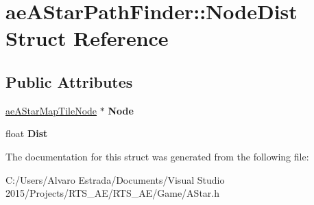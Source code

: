 \hypertarget{structae_a_star_path_finder_1_1_node_dist}{}\section{ae\+A\+Star\+Path\+Finder\+:\+:Node\+Dist Struct Reference}
\label{structae_a_star_path_finder_1_1_node_dist}
\subsection*{Public Attributes}
\begin{DoxyCompactItemize}
\item 
\hyperlink{classae_a_star_map_tile_node}{ae\+A\+Star\+Map\+Tile\+Node} $\ast$ {\bfseries Node}\hypertarget{structae_a_star_path_finder_1_1_node_dist_a7bf8d0df285c6df55160aa188395d807}{}\label{structae_a_star_path_finder_1_1_node_dist_a7bf8d0df285c6df55160aa188395d807}

\item 
float {\bfseries Dist}\hypertarget{structae_a_star_path_finder_1_1_node_dist_a7ac0cb8ee4e1c7ee9170dc49db938b87}{}\label{structae_a_star_path_finder_1_1_node_dist_a7ac0cb8ee4e1c7ee9170dc49db938b87}

\end{DoxyCompactItemize}


The documentation for this struct was generated from the following file\+:\begin{DoxyCompactItemize}
\item 
C\+:/\+Users/\+Alvaro Estrada/\+Documents/\+Visual Studio 2015/\+Projects/\+R\+T\+S\+\_\+\+A\+E/\+R\+T\+S\+\_\+\+A\+E/\+Game/A\+Star.\+h\end{DoxyCompactItemize}
